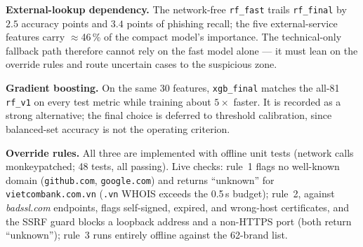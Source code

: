 \documentclass[conference]{IEEEtran}
\begin{document}
\textbf{External-lookup dependency.} The network-free \texttt{rf\_fast} trails
\texttt{rf\_final} by $2.5$ accuracy points and $3.4$ points of phishing recall;
the five external-service features carry $\approx$46\,\% of the compact model's
importance. The technical-only fallback path therefore cannot rely on the fast
model alone --- it must lean on the override rules and route uncertain cases to
the suspicious zone.

\textbf{Gradient boosting.} On the same 30 features, \texttt{xgb\_final} matches
the all-81 \texttt{rf\_v1} on every test metric while training about
$5\times$ faster. It is recorded as a strong alternative; the final choice is
deferred to threshold calibration, since balanced-set accuracy is not the
operating criterion.

\textbf{Override rules.} All three are implemented with offline unit tests
(network calls monkeypatched; 48 tests, all passing). Live checks: rule~1 flags
no well-known domain (\texttt{github.com}, \texttt{google.com}) and returns
``unknown'' for \texttt{vietcombank.com.vn} (\texttt{.vn} WHOIS exceeds the
0.5\,s budget); rule~2, against \emph{badssl.com} endpoints, flags self-signed,
expired, and wrong-host certificates, and the SSRF guard blocks a loopback
address and a non-HTTPS port (both return ``unknown''); rule~3 runs entirely
offline against the 62-brand list.
\end{document}
